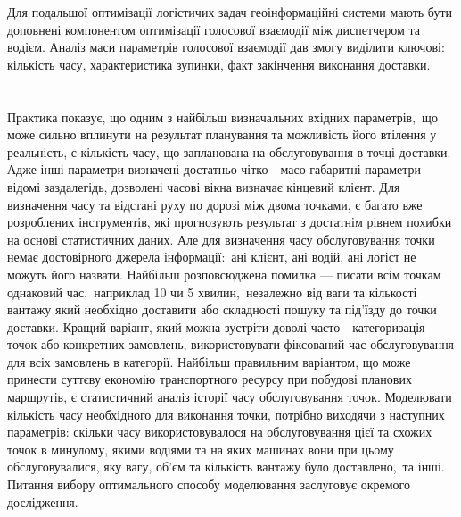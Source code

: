 Для подальшої оптимізації логістичих задач геоінформаційні системи мають бути доповнені компонентом оптимізації голосової взаємодії між диспетчером та водієм. Аналіз маси параметрів голосової взаємодії дав змогу виділити ключові: кількість часу, характеристика зупинки, факт закінчення виконання доставки.

\section{}
Практика показує, що одним з найбільш визначальних вхідних параметрів, що може сильно вплинути на результат планування та можливість його втілення у  реальність, є кількість часу, що запланована на обслуговування в точці доставки. Адже інші параметри визначені достатньо чітко - масо-габаритні параметри відомі заздалегідь, дозволені часові вікна визначає кінцевий клієнт. Для визначення часу та відстані руху по дорозі між двома точками, є багато вже розроблених інструментів, які прогнозують результат з достатнім рівнем похибки на основі статистичних даних. Але для визначення часу обслуговування точки немає достовірного джерела інформації: ані клієнт, ані водій, ані логіст не можуть його назвати. Найбільш розповсюджена помилка --- писати всім точкам однаковий час, наприклад 10 чи 5  хвилин, незалежно від ваги та кількості вантажу який необхідно доставити або складності пошуку та під'їзду до точки доставки. Кращий варіант, який можна зустріти доволі часто - категоризація точок або конкретних замовлень, використовувати фіксований час обслуговування для всіх замовлень в категорії. Найбільш правильним варіантом, що може принести суттєву економію транспортного ресурсу при побудові планових маршрутів, є статистичний аналіз історії часу обслуговування точок. Моделювати кількість часу необхідного для виконання точки, потрібно виходячи з наступних параметрів: скільки часу використовувалося на обслуговування цієї та схожих точок в минулому, якими водіями та на яких машинах вони при цьому обслуговувалися, яку вагу, об'єм та кількість вантажу було доставлено, та інші. Питання вибору оптимального способу моделювання заслуговує окремого дослідження.

